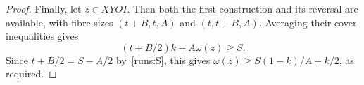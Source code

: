 \begin{proof}
Finally, let $z\in XYOI$. Then both the first construction and its reversal are available, with fibre sizes $(t+B,t,A)$ and $(t,t+B,A)$. Averaging their cover inequalities gives
\[
 (t+B/2)k+A\omega(z)\ge S.
\]
Since $t+B/2=S-A/2$ by~\eqref{runs:S}, this gives $\omega(z)\ge S(1-k)/A+k/2$, as required.
\end{proof}
